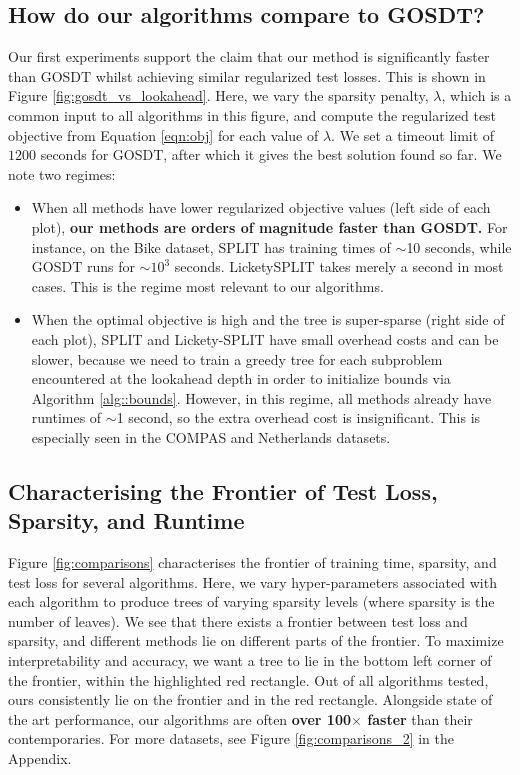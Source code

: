 \subsection{How do our algorithms compare to GOSDT?}
Our first experiments support the claim that our method is significantly faster than GOSDT whilst achieving similar regularized test losses. This is shown in Figure \ref{fig:gosdt_vs_lookahead}. Here, we vary the sparsity penalty, $\lambda$, which is a common input to all algorithms in this figure, and compute the regularized test objective from Equation \ref{eqn:obj} for each value of $\lambda$. We set a timeout limit of $1200$ seconds for GOSDT, after which it gives the best solution found so far. We note two regimes:
\begin{itemize}
\item When all methods have lower regularized objective values (left side of each plot), \textbf{our methods are orders of magnitude faster than GOSDT.} For instance, on the Bike dataset, SPLIT has training times of $\sim$10 seconds, while GOSDT runs for $\sim$$10^3$ seconds. LicketySPLIT takes merely a second in most cases. This is the regime most relevant to our algorithms. 

\item When the optimal objective is high and the tree is super-sparse (right side of each plot), SPLIT and Lickety-SPLIT have small overhead costs and can be slower, because we need to train a greedy tree for each subproblem encountered at the lookahead depth in order to initialize bounds via Algorithm \ref{alg::bounds}. However, in this regime, all methods already have runtimes of $\sim$1 second, so the extra overhead cost is insignificant. This is especially seen in the COMPAS and Netherlands datasets. 
\end{itemize}


\subsection{Characterising the Frontier of Test Loss, Sparsity, and Runtime}
Figure \ref{fig:comparisons} characterises the frontier of training time, sparsity, and test loss for several algorithms. Here, we vary hyper-parameters associated with each algorithm to produce trees of varying sparsity levels (where sparsity is the number of leaves). We see that there exists a frontier between test loss and sparsity, and different methods lie on different parts of the frontier. To maximize interpretability and accuracy, we want a tree to lie in the bottom left corner of the frontier, within the highlighted red rectangle. Out of all algorithms tested, ours consistently lie on the frontier and in the red rectangle. Alongside state of the art performance, our algorithms are often \textbf{over 100$\times$ faster} than their contemporaries. For more datasets, see Figure \ref{fig:comparisons_2} in the Appendix. 

